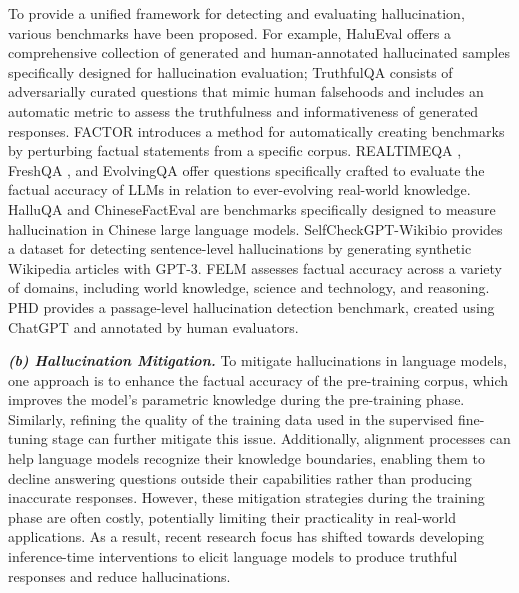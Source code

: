 To provide a unified framework for detecting and evaluating hallucination, various benchmarks have been proposed. For example, HaluEval \cite{li2023halueval} offers a comprehensive collection of generated and human-annotated hallucinated samples specifically designed for hallucination evaluation; TruthfulQA \cite{lin2021truthfulqa} consists of adversarially curated questions that mimic human falsehoods and includes an automatic metric to assess the truthfulness and informativeness of generated responses. FACTOR \cite{muhlgay2023generating} introduces a method for automatically creating benchmarks by perturbing factual statements from a specific corpus. REALTIMEQA \cite{kasai2024realtime}, FreshQA \cite{vu2023freshllms}, and EvolvingQA \cite{kim2024carpe} offer questions specifically crafted to evaluate the factual accuracy of LLMs in relation to ever-evolving real-world knowledge. HalluQA \cite{cheng2023evaluating} and ChineseFactEval \cite{liang2023uhgeval} are benchmarks specifically designed to measure hallucination in Chinese large language models. SelfCheckGPT-Wikibio \cite{xiong2023can} provides a dataset for detecting sentence-level hallucinations by generating synthetic Wikipedia articles with GPT-3. FELM \cite{zhao2024felm} assesses factual accuracy across a variety of domains, including world knowledge, science and technology, and reasoning. PHD \cite{yang2023new} provides a passage-level hallucination detection benchmark, created using ChatGPT and annotated by human evaluators. 

\textbf{\textit{(b) Hallucination Mitigation.}}
To mitigate hallucinations in language models, one approach is to enhance the factual accuracy of the pre-training corpus, which improves the model’s parametric knowledge during the pre-training phase. Similarly, refining the quality of the training data used in the supervised fine-tuning stage can further mitigate this issue. Additionally, alignment processes can help language models recognize their knowledge boundaries, enabling them to decline answering questions outside their capabilities rather than producing inaccurate responses. \cite{zhang2023siren} However, these mitigation strategies during the training phase are often costly, potentially limiting their practicality in real-world applications. As a result, recent research focus has shifted towards developing inference-time interventions to elicit language models to produce truthful responses and reduce hallucinations.

